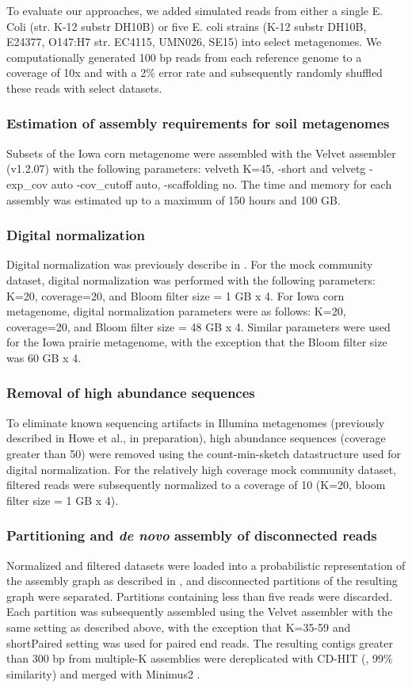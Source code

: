\documentclass[11pt]{article} %
\begin{document}
To evaluate our approaches, we added simulated reads from either a
single E. Coli (str. K-12 substr DH10B) or five E. coli strains (K-12
substr DH10B, E24377, O147:H7 str. EC4115, UMN026, SE15) into select
metagenomes.  We computationally generated 100 bp reads from each
reference genome to a coverage of 10x and with a 2\% error rate and
subsequently randomly shuffled these reads with select datasets.

\subsubsection{Estimation of assembly requirements for soil metagenomes}
Subsets of the Iowa corn metagenome were assembled with the Velvet
assembler (v1.2.07) with the following parameters: velveth K=45,
-short and velvetg -exp\_cov auto -cov\_cutoff auto, -scaffolding no.
The time and memory for each assembly was estimated up to a maximum of
150 hours and 100 GB.

\subsubsection{Digital normalization}
Digital normalization was previously describe in \cite{browndiginorm}.  
For the mock
community dataset, digital normalization was performed with the
following parameters: K=20, coverage=20, and Bloom filter size = 1 GB
x 4.  For Iowa corn metagenome, digital normalization parameters were
as follows: K=20, coverage=20, and Bloom filter size = 48 GB x 4.
Similar parameters were used for the Iowa prairie metagenome, with the
exception that the Bloom filter size was 60 GB x 4.

\subsubsection{Removal of high abundance sequences}
To eliminate known sequencing artifacts in Illumina metagenomes
(previously described in Howe et al., in preparation), high abundance 
sequences (coverage
greater than 50) were removed using the count-min-sketch datastructure
used for digital normalization.  For the relatively high coverage mock
community dataset, filtered reads were subsequently normalized to a
coverage of 10 (K=20, bloom filter size = 1 GB x 4).

\subsubsection{Partitioning and \emph{de novo} assembly of disconnected reads}
Normalized and filtered datasets were loaded into a probabilistic
representation of the assembly graph as described in \cite{Pell:2012cq}, and
disconnected partitions of the resulting graph were separated.
Partitions containing less than five reads were discarded.  Each
partition was subsequently assembled using the Velvet assembler with
the same setting as described above, with the exception that K=35-59
and shortPaired setting was used for paired end reads.  The resulting
contigs greater than 300 bp from multiple-K assemblies were
dereplicated with CD-HIT (\cite{Fu:2012jk}, 99\% similarity) and merged with
Minimus2 \cite{Sommer:2007p1253}.
\end{document}
